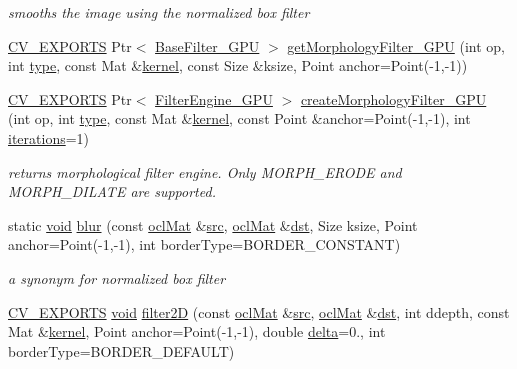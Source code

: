 \begin{DoxyCompactItemize}
\begin{DoxyCompactList}\small\item\em smooths the image using the normalized box filter \end{DoxyCompactList}\item 
\hyperlink{core_2types__c_8h_a1bf9f0e121b54272da02379cfccd0a2b}{C\-V\-\_\-\-E\-X\-P\-O\-R\-T\-S} Ptr$<$ \hyperlink{classcv_1_1ocl_1_1BaseFilter__GPU}{Base\-Filter\-\_\-\-G\-P\-U} $>$ \hyperlink{namespacecv_1_1ocl_adfe9f99e6bc59974d466c04fd7a145da}{get\-Morphology\-Filter\-\_\-\-G\-P\-U} (int op, int \hyperlink{imgproc__c_8h_a84612d8738bf935200cf32a103d8efe1}{type}, const Mat \&\hyperlink{imgproc__c_8h_a863a75780ba6c5de552f5361cb0d2c89}{kernel}, const Size \&ksize, Point anchor=Point(-\/1,-\/1))
\item 
\hyperlink{core_2types__c_8h_a1bf9f0e121b54272da02379cfccd0a2b}{C\-V\-\_\-\-E\-X\-P\-O\-R\-T\-S} Ptr$<$ \hyperlink{classcv_1_1ocl_1_1FilterEngine__GPU}{Filter\-Engine\-\_\-\-G\-P\-U} $>$ \hyperlink{namespacecv_1_1ocl_ad98f46696779f35ff98cbbeea7594198}{create\-Morphology\-Filter\-\_\-\-G\-P\-U} (int op, int \hyperlink{imgproc__c_8h_a84612d8738bf935200cf32a103d8efe1}{type}, const Mat \&\hyperlink{imgproc__c_8h_a863a75780ba6c5de552f5361cb0d2c89}{kernel}, const Point \&anchor=Point(-\/1,-\/1), int \hyperlink{tracking_8hpp_a17372ac3c8ba01bc6cfc265b2824992e}{iterations}=1)
\begin{DoxyCompactList}\small\item\em returns morphological filter engine. Only M\-O\-R\-P\-H\-\_\-\-E\-R\-O\-D\-E and M\-O\-R\-P\-H\-\_\-\-D\-I\-L\-A\-T\-E are supported. \end{DoxyCompactList}\item 
static \hyperlink{legacy_8hpp_a8bb47f092d473522721002c86c13b94e}{void} \hyperlink{namespacecv_1_1ocl_a21e16a92506cc0f832c305adcf33cfd3}{blur} (const \hyperlink{classcv_1_1ocl_1_1oclMat}{ocl\-Mat} \&\hyperlink{legacy_8hpp_a371cd109b74033bc4366f584edd3dacc}{src}, \hyperlink{classcv_1_1ocl_1_1oclMat}{ocl\-Mat} \&\hyperlink{photo__c_8h_aed13e2a25279b24dc954073233fef7a5}{dst}, Size ksize, Point anchor=Point(-\/1,-\/1), int border\-Type=B\-O\-R\-D\-E\-R\-\_\-\-C\-O\-N\-S\-T\-A\-N\-T)
\begin{DoxyCompactList}\small\item\em a synonym for normalized box filter \end{DoxyCompactList}\item 
\hyperlink{core_2types__c_8h_a1bf9f0e121b54272da02379cfccd0a2b}{C\-V\-\_\-\-E\-X\-P\-O\-R\-T\-S} \hyperlink{legacy_8hpp_a8bb47f092d473522721002c86c13b94e}{void} \hyperlink{namespacecv_1_1ocl_a01ec95bb7d227f90684f8cd7d168f03c}{filter2\-D} (const \hyperlink{classcv_1_1ocl_1_1oclMat}{ocl\-Mat} \&\hyperlink{legacy_8hpp_a371cd109b74033bc4366f584edd3dacc}{src}, \hyperlink{classcv_1_1ocl_1_1oclMat}{ocl\-Mat} \&\hyperlink{photo__c_8h_aed13e2a25279b24dc954073233fef7a5}{dst}, int ddepth, const Mat \&\hyperlink{imgproc__c_8h_a863a75780ba6c5de552f5361cb0d2c89}{kernel}, Point anchor=Point(-\/1,-\/1), double \hyperlink{legacy_8hpp_ac867054f00f4be8b1f3ebce6fba31982}{delta}=0., int border\-Type=B\-O\-R\-D\-E\-R\-\_\-\-D\-E\-F\-A\-U\-L\-T)

\end{DoxyCompactItemize}

